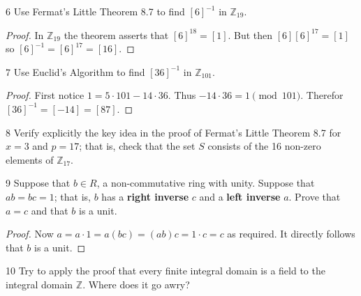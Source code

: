 \begin{problem}{6}
    Use Fermat's Little Theorem 8.7 to find 
    $[6]^{-1}$ in $\mathbb{Z}_{19}$.
\end{problem}
\solved

\begin{proof}
    In $\mathbb{Z}_{19}$ the theorem asserts that 
        $[6]^{18} = [1]$.
    But then $[6][6]^{17} = [1]$ so $[6]^{-1} = [6]^{17} = [16]$.
\end{proof}

\begin{problem}{7}
    Use Euclid's Algorithm to find $[36]^{-1}$ in $\mathbb{Z}_{101}$.
\end{problem}
\solved

\begin{proof}
    First notice $1 = 5 \cdot 101 - 14 \cdot 36$.
    Thus $-14 \cdot 36 = 1 \pmod 101$.
    Therefor $[36]^{-1} = [-14] = [87]$.
\end{proof}

\begin{problem}{8}
    Verify explicitly the key idea in the proof of Fermat's Little Theorem 8.7 for
    $x = 3$ and $p = 17$; that is, check that the set $S$ consists of the 16 non-zero
    elements of $\mathbb{Z}_{17}$.
\end{problem}
\unsolved

\begin{problem}{9}
    Suppose that $b \in R$, a non-commutative ring 
    with unity. Suppose that $ab = bc = 1$;
    that is, $b$ has a \textbf{right inverse} $c$
    and a \textbf{left inverse} $a$. Prove that 
    $a = c$ and that $b$ is a unit.
\end{problem}
\solved

\begin{proof}
    Now $a = a \cdot 1 = a(bc) = (ab)c = 1 \cdot c = c$ as required.
    It directly follows that $b$ is a unit.
\end{proof}

\begin{problem}{10}
    Try to apply the proof that every finite integral domain is a field to the integral
    domain $\mathbb{Z}$. Where does it go awry?
\end{problem}
\unsolved

